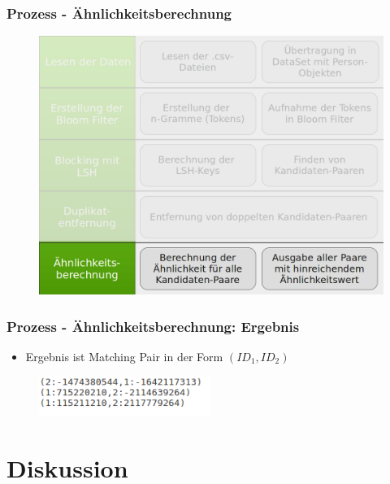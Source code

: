 \documentclass{beamer}
\begin{document}
    \begin{frame}
    		\frametitle{Prozess - Ähnlichkeitsberechnung}
    		\begin{figure}[H]
    			\includegraphics[width=\textwidth]{graphics/process_5.png}
    		\end{figure}
    \end{frame}
    
    \begin{frame}
    		\frametitle{Prozess - Ähnlichkeitsberechnung: Ergebnis}
    		\begin{itemize}
    			\item Ergebnis ist Matching Pair in der Form $(ID_1, ID_2)$
    		\end{itemize}
    		\begin{figure}[H]
    			\includegraphics[width=0.5\textwidth]{graphics/endresult.png}
    		\end{figure}
    \end{frame}
    
    \section[Section]{Diskussion}
    
\end{document}
